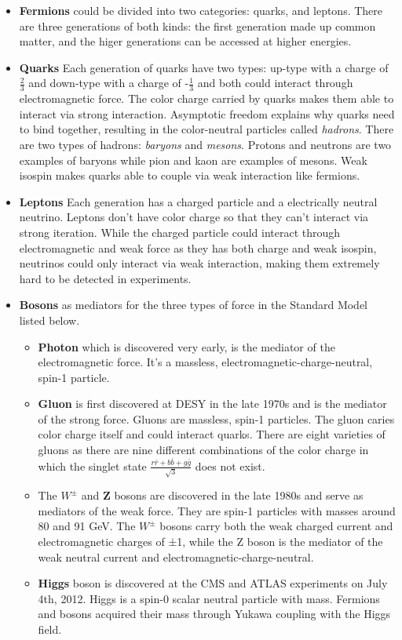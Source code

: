 \begin{itemize}
  \item \textbf{Fermions} could be divided into two categories: quarks, and leptons. There are three generations of both kinds: the first generation made up common matter, and the higer generations can be accessed at higher energies.
  \item \textbf{Quarks} Each generation of quarks have two types: up-type with a charge of $\frac{2}{3}$ and down-type with a charge of -$\frac{1}{3}$ and both could interact through electromagnetic force. The color charge carried by quarks makes them able to 
interact via strong interaction. Asymptotic freedom explains why quarks need to bind together, resulting in the color-neutral particles called \textit{hadrons}. There are two types of hadrons: \textit{baryons} and \textit{mesons}. Protons and neutrons are two examples of baryons while pion and kaon are examples of mesons. Weak isospin makes quarks able to couple via weak interaction like fermions.
  \item \textbf{Leptons} Each generation has a charged particle and a electrically neutral neutrino. Leptons don't have color charge so that they can't interact via strong iteration. While the charged particle could interact through electromagnetic and weak force as they has both charge and weak isospin, neutrinos could only interact via weak interaction, making them extremely hard to be detected in experiments.
  \item \textbf{Bosons} as mediators for the three types of force in the Standard Model listed below.
\begin{itemize}
  \item \textbf{Photon} which is discovered very early, is the mediator of the electromagnetic force. It's a massless, electromagnetic-charge-neutral, spin-1 particle.
  \item \textbf{Gluon} is first discovered at DESY in the late 1970s and is the mediator of the strong force. Gluons are massless, spin-1 particles. The gluon caries color charge itself and could interact quarks. There are eight varieties of gluons as there are nine different combinations of the color charge in which the singlet state $\frac{r\bar{r}+b\bar{b}+g\bar{g}}{\sqrt{3}}$ does not exist.

  \item The \textbf{$W^{\pm}$} and \textbf{Z} bosons are discovered in the late 1980s and serve as mediators of the weak force. They are spin-1 particles with masses around 80 and 91 GeV. The \textbf{$W^{\pm}$} bosons carry both the weak charged current and electromagnetic charges of ±1, while the Z boson is the mediator of the weak neutral current and electromagnetic-charge-neutral. 
    \item \textbf{Higgs} boson is discovered at the CMS and ATLAS experiments on July 4th, 2012\cite{Aad:2012tfa}\cite{Chatrchyan:2012xdj}. Higgs is a spin-0 scalar neutral particle with mass. Fermions and bosons acquired their mass through Yukawa coupling with the Higgs field. 
\end{itemize}
\end{itemize}
 
